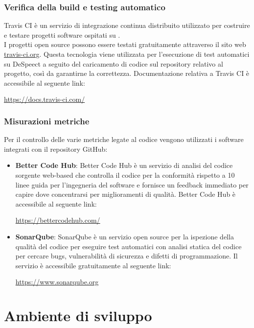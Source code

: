 \documentclass[openany,12pt,a4paper]{report}
\begin{document}
	\subsection{Verifica della build e testing automatico}
	Travis CI è un servizio di integrazione continua distribuito utilizzato per costruire e testare progetti software ospitati su . \\ I progetti open source possono essere testati gratuitamente attraverso il sito web  \url{travis-ci.org}. Questa tecnologia viene utilizzata per l'esecuzione di test automatici su DeSpeect a seguito del caricamento di codice sul repository relativo al progetto, così da garantirne la correttezza. Documentazione relativa a Travis CI è accessibile al seguente link:
	\begin{center}
		\url{https://docs.travis-ci.com/}
	\end{center}
	
	\subsection{Misurazioni metriche}
	Per il controllo delle varie metriche legate al codice vengono utilizzati i software integrati con il repository GitHub:
	\begin{itemize}
		\item \textbf{Better Code Hub}: Better Code Hub è un servizio di analisi del codice sorgente web-based che controlla il codice per la conformità rispetto a 10 linee guida per l'ingegneria del software e fornisce un feedback immediato per capire dove concentrarsi per miglioramenti di qualità. Better Code Hub è accessibile al seguente link:
		\begin{center}
			\url{https://bettercodehub.com/}
		\end{center}
		
		\item \textbf{SonarQube}: SonarQube è un servizio open source per la ispezione della qualità del codice per eseguire test automatici con analisi statica del codice per cercare bugs, vulnerabilità di sicurezza e difetti di programmazione. Il servizio è accessibile gratuitamente al seguente link: 
		\begin{center}
			\url{https://www.sonarqube.org}
		\end{center}
	\end{itemize} 
	
	\chapter{Ambiente di sviluppo}
	
\end{document}
